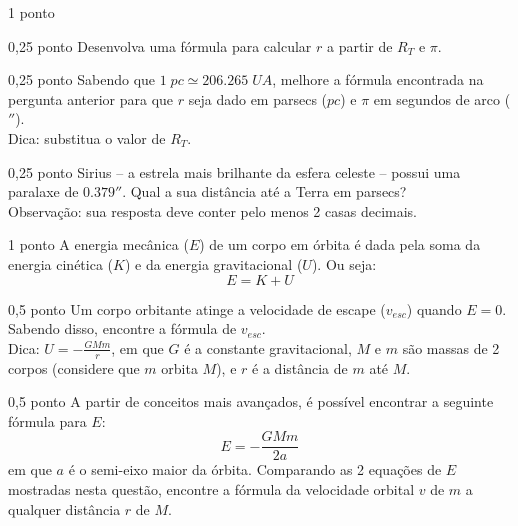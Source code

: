 \documentclass{../lista}
\begin{document}
\begin{questao}{1 ponto}
		\begin{pergunta}{0,25 ponto}
			Desenvolva uma fórmula para calcular $r$ a partir de $R_T$ e $\pi$.

			\espacoCalculo
			\espacoRespostaPergunta
		\end{pergunta}

		\begin{pergunta}{0,25 ponto}
			Sabendo que $1 \; pc \simeq 206.265 \; UA$, melhore a fórmula encontrada na pergunta anterior para que $r$ seja dado em parsecs ($pc$) e $\pi$ em segundos de arco ($''$). \\
			Dica: substitua o valor de $R_T$.

			\espacoCalculo[12cm]
			\espacoRespostaPergunta
		\end{pergunta}

		\begin{pergunta}{0,25 ponto}
			Sirius -- a estrela mais brilhante da esfera celeste -- possui uma paralaxe de $0.379''$. Qual a sua distância até a Terra em parsecs? \\
			Observação: sua resposta deve conter pelo menos 2 casas decimais.

			\espacoCalculo
			\espacoRespostaPergunta
		\end{pergunta}
	\end{questao}

	\begin{questao}{1 ponto}
		A energia mecânica ($E$) de um corpo em órbita é dada pela soma da energia cinética ($K$) e da energia gravitacional ($U$). Ou seja:
		\begin{equation}
			E=K+U
		\end{equation}

		\begin{pergunta}{0,5 ponto}
			Um corpo orbitante atinge a velocidade de escape ($v_{esc}$) quando $E=0$. Sabendo disso, encontre a fórmula de $v_{esc}$. \\
			Dica: $U = - \frac{GMm}{r}$, em que $G$ é a constante gravitacional, $M$ e $m$ são massas de 2 corpos (considere que $m$ orbita $M$), e $r$ é a distância de $m$ até $M$.

			\espacoCalculo[10cm]
			\espacoRespostaPergunta
		\end{pergunta}

		\begin{pergunta}{0,5 ponto}
			A partir de conceitos mais avançados, é possível encontrar a seguinte fórmula para $E$:
			\begin{equation}
				E = -\frac{GMm}{2a}
			\end{equation}
			em que $a$ é o semi-eixo maior da órbita. Comparando as 2 equações de $E$ mostradas nesta questão, encontre a fórmula da velocidade orbital $v$ de $m$ a qualquer distância $r$ de $M$.

			\espacoCalculo[10cm]
			\espacoRespostaPergunta
		\end{pergunta}
	\end{questao}
\end{document}

